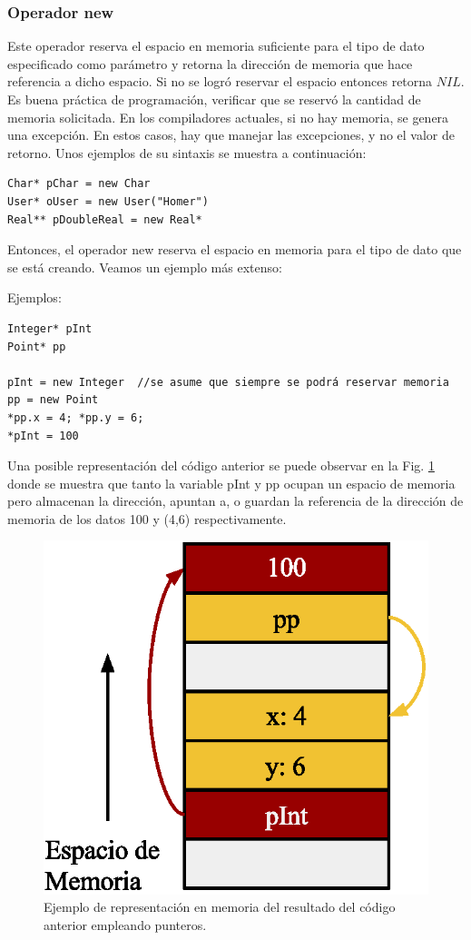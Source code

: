 \subsubsection{Operador new}

Este operador reserva el espacio en memoria suficiente para el tipo de dato especificado como parámetro y retorna la dirección de memoria que hace referencia a dicho espacio. Si no se logró reservar el espacio entonces retorna $NIL$. Es buena práctica de programación, verificar que se reservó la cantidad de memoria solicitada. En los compiladores actuales, si no hay memoria, se genera una excepción. En estos casos, hay que manejar las excepciones, y no el valor de retorno. Unos ejemplos de su sintaxis se muestra a continuación:
\begin{lstlisting}[upquote=true, language=pseudo]
Char* pChar = new Char
User* oUser = new User("Homer")
Real** pDoubleReal = new Real*
\end{lstlisting}

Entonces, el operador new reserva el espacio en memoria para el tipo de dato que se está creando. Veamos un ejemplo más extenso:

Ejemplos:
\begin{lstlisting}[upquote=true, language=pseudo]
Integer* pInt
Point* pp

pInt = new Integer	//se asume que siempre se podrá reservar memoria
pp = new Point
*pp.x = 4; *pp.y = 6;
*pInt = 100
\end{lstlisting}

Una posible representación del código anterior se puede observar en la Fig. \ref{fig:pointer} donde se muestra que tanto la variable pInt y pp ocupan un espacio de memoria pero almacenan la dirección, apuntan a, o guardan la referencia de la dirección de memoria de los datos 100 y (4,6) respectivamente.

\begin{figure}[!htb]
\centering
\includegraphics[scale=.7]{images/pointers.eps}
\caption{Ejemplo de representación en memoria del resultado del código anterior empleando punteros.}
\label{fig:pointer}
\end{figure}

